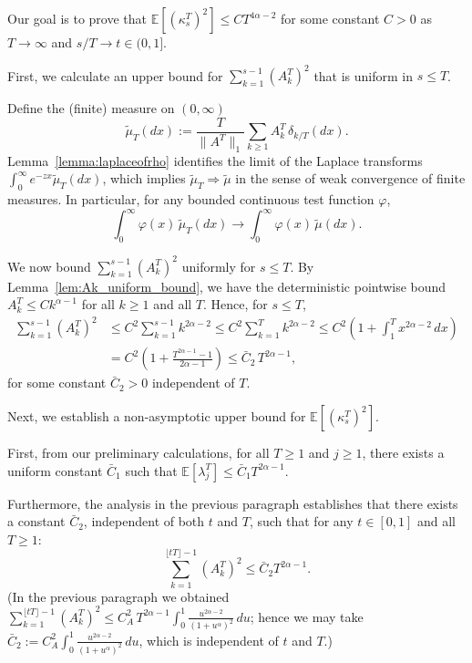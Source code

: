 \documentclass[letterpaper]{article}
\numberwithin{equation}{section}
\theoremstyle{definition}
\theoremstyle{remark}
\begin{document}
\begin{itemize}
    Our goal is to prove that $\mathbb{E}[(\kappa_s^T)^2] \le C T^{4\alpha-2}$ for some constant $C>0$ as $T\to\infty$ and $s/T \to t \in (0,1]$. 
    
    {
    First, we calculate an upper bound for $\sum_{k=1}^{s-1} (A_k^T)^2$ that is uniform in $s\le T$.

    Define the (finite) measure on $(0,\infty)$
    \[
    \widetilde\mu_T(dx):=\frac{T}{\|A^T\|_1}\sum_{k\ge1}A_k^T\,\delta_{k/T}(dx).
    \]
    Lemma~\ref{lemma:laplaceofrho} identifies the limit of the Laplace transforms
    $\int_0^\infty e^{-zx}\widetilde\mu_T(dx)$, which implies $\widetilde\mu_T\Rightarrow \widetilde\mu$ in the sense of weak convergence of finite measures.
    In particular, for any bounded continuous test function $\varphi$,
    \[
    \int_0^\infty \varphi(x)\,\widetilde\mu_T(dx)\longrightarrow \int_0^\infty \varphi(x)\,\widetilde\mu(dx).
    \]

    {
    We now bound $\sum_{k=1}^{s-1}(A_k^T)^2$ uniformly for $s\le T$.
    By Lemma~\ref{lem:Ak_uniform_bound}, we have the deterministic pointwise bound
    $A_k^T\le C k^{\alpha-1}$ for all $k\ge1$ and all $T$.
    Hence, for $s\le T$,
    \begin{align*}
    \sum_{k=1}^{s-1}(A_k^T)^2
    &\le C^2\sum_{k=1}^{s-1}k^{2\alpha-2}
    \le C^2\sum_{k=1}^{T}k^{2\alpha-2}
    \le C^2\left(1+\int_1^{T}x^{2\alpha-2}\,dx\right)\\
    &= C^2\left(1+\frac{T^{2\alpha-1}-1}{2\alpha-1}\right)
    \le \bar C_2\,T^{2\alpha-1},
    \end{align*}
    for some constant $\bar C_2>0$ independent of $T$.
    }
    }
    
    
    
    Next, we establish a non-asymptotic upper bound for $\mathbb{E}[(\kappa_s^T)^2]$.

    First, from our preliminary calculations, for all $T \ge 1$ and $j \ge 1$, there exists a uniform constant $\bar{C}_1$ such that $\mathbb{E}[\lambda_j^T] \le \bar{C}_1 T^{2\alpha-1}$. 

    Furthermore, the analysis in the previous paragraph establishes that there exists a constant $\bar{C}_2$, independent of both $t$ and $T$, such that for any $t \in [0,1]$ and all $T \ge 1$:
    \[ \sum_{k=1}^{\lfloor tT \rfloor - 1} (A_k^T)^2 \le \bar{C}_2 T^{2\alpha-1}. \]
    {
    (In the previous paragraph we obtained $\sum_{k=1}^{\lfloor tT\rfloor-1}(A_k^T)^2 \le C_A^2\,T^{2\alpha-1}\int_{0}^{1}\frac{u^{2\alpha-2}}{(1+u^\alpha)^2}\,du$; hence we may take $\bar C_2:=C_A^2\int_{0}^{1}\frac{u^{2\alpha-2}}{(1+u^\alpha)^2}\,du$, which is independent of $t$ and $T$.)
    }


\end{itemize}
\end{document}
